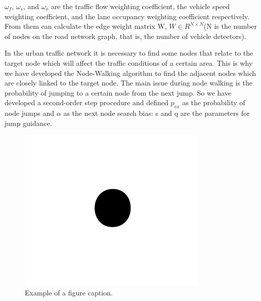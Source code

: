 \documentclass[conference]{IEEEtran}
\begin{document}
\par
$\omega _f$, $\omega _s$, and $\omega_o$ are the traffic flow weighting coefficient, the vehicle speed weighting coefficient, and the lane occupancy weighting coefficient respectively. From them can calculate the edge weight matrix W, $ W\in R^{N\times N} $(N is the number of nodes on the road network graph, that is, the number of vehicle detectors).
\par
In the urban traffic network it is necessary to find some nodes that relate to the target node which will affect the traffic conditions of a certain area. This is why we have developed the Node-Walking algorithm to find the adjacent nodes which are closely linked to the target node. The main issue during node walking is the probability of jumping to a certain node from the next jump. So we have developed a second-order step procedure and defined $p_{vx}$ as the probability of node jumps and $\alpha$  as the next node search bias: s and q are the parameters for jump guidance.







\begin{figure}[htbp]
\centerline{\includegraphics{fig1.png}}
\caption{Example of a figure caption.}
\label{fig}
\end{figure}
\end{document}
